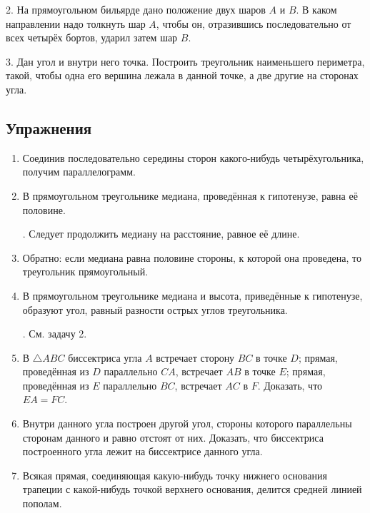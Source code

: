 \documentclass[oneside]{book}
\begin{document}
2.
На прямоугольном бильярде дано положение двух шаров $A$ и $B$.
В каком направлении надо толкнуть шар $A$, чтобы он, отразившись последовательно от всех четырёх бортов, ударил затем шар $B$.

3.
Дан угол и внутри него точка.
Построить треугольник наименьшего периметра, такой, чтобы одна его вершина лежала в данной точке, а две другие на сторонах угла.

\subsection*{Упражнения}


\begin{center}
\end{center}

\begin{enumerate}

 \item
Соединив последовательно середины сторон какого-нибудь четырёхугольника, получим параллелограмм.

 \item
В прямоугольном треугольнике медиана, проведённая к гипотенузе, равна её половине.

.
Следует продолжить медиану на расстояние, равное её длине.

 \item
Обратно:
если медиана равна половине стороны, к которой она проведена, то треугольник прямоугольный.

 \item
В прямоугольном треугольнике медиана и высота, приведённые к гипотенузе, образуют угол, равный разности острых углов треугольника.

.
См.
задачу 2.

 \item
В $\triangle ABC$ биссектриса угла $A$ встречает сторону $BC$ в точке $D$;
прямая, проведённая из $D$ параллельно $CA$, встречает $AB$ в точке $E$;
прямая, проведённая из $E$ параллельно $BC$, встречает $AC$ в $F$.
Доказать, что $EA=FC$.

 \item
Внутри данного угла построен другой угол, стороны которого параллельны сторонам данного и равно отстоят от них.
Доказать, что биссектриса построенного угла лежит на биссектрисе данного угла.

 \item
Всякая прямая, соединяющая какую-нибудь точку нижнего основания трапеции с какой-нибудь точкой верхнего основания, делится средней линией пополам.


\end{enumerate}
\end{document}
